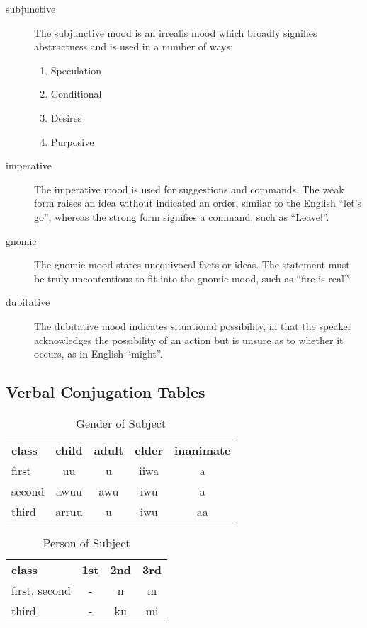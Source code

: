 \begin{description}

\item[subjunctive] The subjunctive mood is an irrealis mood which broadly
  signifies abstractness and is used in a number of ways:

  \begin{enumerate}
      \item Speculation
      \item Conditional
      \item Desires
      \item Purposive
  \end{enumerate}

\item[imperative] The imperative mood is used for suggestions and commands. The
  weak form raises an idea without indicated an order, similar to the English
  ``let's go'', whereas the strong form signifies a command, such as ``Leave!''.

\item[gnomic] The gnomic mood states unequivocal facts or ideas. The statement
  must be truly uncontentious to fit into the gnomic mood, such as ``fire is
  real''.

\item[dubitative] The dubitative mood indicates situational possibility, in that
  the speaker acknowledges the possibility of an action but is unsure as to
  whether it occurs, as in English ``might''.

\end{description}

\subsection{Verbal Conjugation Tables}

\begin{table}[h]
\centering
\begin{tabular}{lcccc}
\textbf{class} & \textbf{child} & \textbf{adult} & \textbf{elder} & \textbf{inanimate}\\
first & uu & u & iiwa & a\\
second & awuu & awu & iwu & a\\
third & arruu & u & iwu & aa\\
\end{tabular}
\caption{Gender of Subject}
\end{table}

\begin{table}[h]
\centering
\begin{tabular}{lccc}
\textbf{class} & \textbf{1st} & \textbf{2nd} & \textbf{3rd} \\
first, second & -           & n          & m    \\
third & -           & ku          & mi    \\
\end{tabular}
\caption{Person of Subject}
\end{table}


